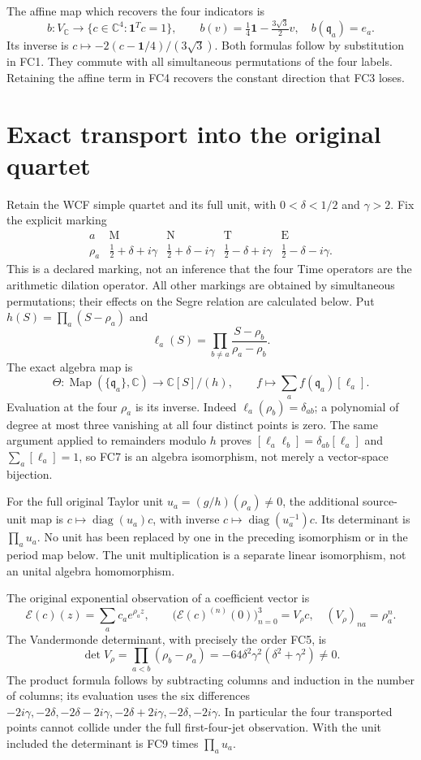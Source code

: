\documentclass[11pt]{article}
\newcommand{\C}{\mathbb C}
\newcommand{\diag}{\operatorname{diag}}
\begin{document}
The affine map which recovers the four indicators is
\[
 b:V_{\C}\longrightarrow\{c\in\C^4:\mathbf1^Tc=1\},\qquad
 b(v)=\tfrac14\mathbf1-\tfrac{3\sqrt3}{2}v,
 \quad b(\mathfrak q_a)=e_a.
 \tag{FC4}
\]
Its inverse is $c\mapsto-2(c-\mathbf1/4)/(3\sqrt3)$.
Both formulas follow by substitution in FC1. They commute with all
simultaneous permutations of the four labels. Retaining the affine term
in FC4 recovers the constant direction that FC3 loses.

\section{Exact transport into the original quartet}
Retain the WCF simple quartet and its full unit, with
$0<\delta<1/2$ and $\gamma>2$. Fix the explicit marking
\[
 \begin{array}{c|cccc}
 a&\mathrm M&\mathrm N&\mathrm T&\mathrm E\\\hline
 \rho_a&\frac12+\delta+i\gamma&\frac12+\delta-i\gamma&
 \frac12-\delta+i\gamma&\frac12-\delta-i\gamma.
 \end{array}
 \tag{FC5}
\]
This is a declared marking, not an inference that the four Time operators
are the arithmetic dilation operator. All other markings are obtained
by simultaneous permutations; their effects on the Segre relation are
calculated below. Put $h(S)=\prod_a(S-\rho_a)$ and
\[
 \ell_a(S)=\prod_{b\ne a}\frac{S-\rho_b}{\rho_a-\rho_b}.
 \tag{FC6}
\]
The exact algebra map is
\[
 \Theta:\operatorname{Map}(\{\mathfrak q_a\},\C)
 \longrightarrow\C[S]/(h),\qquad
 f\longmapsto\sum_a f(\mathfrak q_a)[\ell_a].
 \tag{FC7}
\]
Evaluation at the four $\rho_a$ is its inverse. Indeed
$\ell_a(\rho_b)=\delta_{ab}$; a polynomial of degree at most three
vanishing at all four distinct points is zero. The same argument applied
to remainders modulo $h$ proves
$[\ell_a\ell_b]=\delta_{ab}[\ell_a]$ and
$\sum_a[\ell_a]=1$, so FC7 is an algebra isomorphism, not merely a
vector-space bijection.

For the full original Taylor unit $u_a=(g/h)(\rho_a)\ne0$, the
additional source-unit map is $c\mapsto\diag(u_a)c$, with inverse
$c\mapsto\diag(u_a^{-1})c$. Its determinant is $\prod_a u_a$.
No unit has been replaced by one in the preceding isomorphism or in
the period map below. The unit multiplication is a separate linear
isomorphism, not an unital algebra homomorphism.

The original exponential observation of a coefficient vector is
\[
 \mathcal E(c)(z)=\sum_a c_a e^{\rho_a z},\qquad
 \bigl(\mathcal E(c)^{(n)}(0)\bigr)_{n=0}^3
 =V_\rho c,\quad (V_\rho)_{na}=\rho_a^n.
 \tag{FC8}
\]
The Vandermonde determinant, with precisely the order FC5, is
\[
 \det V_\rho=\prod_{a<b}(\rho_b-\rho_a)
 =-64\delta^2\gamma^2(\delta^2+\gamma^2)\ne0.
 \tag{FC9}
\]
The product formula follows by subtracting columns and induction in the
number of columns; its evaluation uses the six differences
$-2i\gamma,-2\delta,-2\delta-2i\gamma,
-2\delta+2i\gamma,-2\delta,-2i\gamma$.
In particular the four transported points cannot collide under the full
first-four-jet observation. With the unit included the determinant is
FC9 times $\prod_a u_a$.
\end{document}
